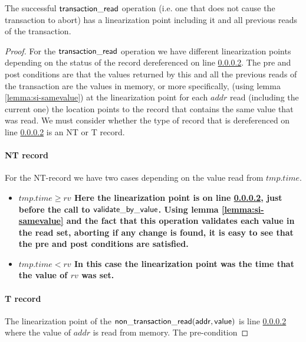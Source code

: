 \begin{lemma}
\label{lemma:si-tread}
The successful $\sf{transaction\_read}$ operation (i.e. one that does not cause the transaction to abort) has a linearization point
including it and all previous reads of the transaction.
\end{lemma}
\begin{proof}
For the $\sf{transaction\_read}$ operation we have different linearization points depending on the status of the record dereferenced
on line \ref{}.
The pre and post conditions are that the values returned by this and all the previous reads of the transaction are the values in memory, or more specifically, 
(using lemma \ref{lemma:si-samevalue}) at the linearization point for each $\mathit{addr}$ read (including the current one) the location points to the record
that contains the same value that was read.
We must consider whether the type of record that is dereferenced on line \ref{} is an NT or T record.
\paragraph{NT record}
For the NT-record we have two cases depending on the value read from $\mathit{tmp.time}$.
\begin{itemize}
\item \bf{$\mathit{tmp.time} \geq \mathit{rv}$}
Here the linearization point is on line \ref{}, just before the call to $\sf{validate\_by\_value}$.
Using lemma \ref{lemma:si-samevalue} and the fact that this operation validates each value in the read set,
aborting if any change is found, it is easy to see that the pre and post conditions are satisfied.
\item \bf{$\mathit{tmp.time} < \mathit{rv}$}
In this case the linearization point was the time that the value of $\mathit{rv}$ was set.

\end{itemize}

\paragraph{T record}



The linearization point of the $\sf{non\_transaction\_read}(addr, value)$ is line \ref{} where the value
of $\mathit{addr}$ is read from memory.
The pre-condition
\end{proof}




